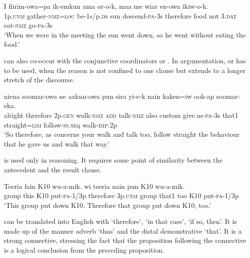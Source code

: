 \ea%
\label{ex:3:x1415}
\gll I fiirim-owa=pa ik-emkun ama or-o-k,  maa me wiar en-owa ikiw-o-k.\\
1p.\textsc{unm} gather-\textsc{nmz}=\textsc{loc} be-1s/p.\textsc{ds} sun descend-\textsc{pa}-3s therefore food not 3.\textsc{dat} eat-\textsc{nmz} go-\textsc{pa}-3s\\
\glt`When we were in the meeting the sun went down, so he went without eating the food.'
\z

 can also co-occur with the conjunctive coordinators  or . In argumentation,  or  has to be used, when the reason is not confined to one clause but extends to a longer stretch of the discourse.

\ea%
\label{ex:3:x1406}
\gll {}  niena soomar-owa ne aakun-owa pun sira yi-e-k nain kaken=iw ook-ap soomar-eka.\\
alright therefore 2p.\textsc{gen} walk-\textsc{nmz} \textsc{add} talk-\textsc{nmz} also custom give.us-\textsc{pa}-3s that1 straight=\textsc{lim} follow-\textsc{ss}.\textsc{seq} walk-\textsc{imp}.2p\\
\glt`So therefore, as concerns your walk and talk too, follow straight the behaviour that he gave us and walk that way.'
\z

 is used only in reasoning. It requires some point of similarity between the antecedent and the result clause.

\ea%
\label{ex:3:x736}
\gll Teeria fain K10 wu-a-mik.  wi teeria nain pun K10 wu-a-mik.\\
group this K10 put-\textsc{pa}-1/3p therefore 3p.\textsc{unm} group that1 too K10 put-\textsc{pa}-1/3p\\
\glt`This group put down K10. Therefore that group put down K10, too.'
\z

 can be translated into English with `therefore', `in that case', `if so, then'. It is made up of the manner adverb  `thus' and the distal demonstrative  `that'. It is a strong connective, stressing the fact that the proposition following the connective is a logical conclusion from the preceding proposition.

